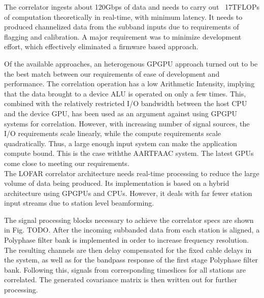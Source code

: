 \documentclass{ws-jai}
\begin{document}
The correlator ingests about 120Gbps of data and needs to carry out ~17TFLOPs of
computation  theoretically  in real-time,  with  minimum  latency. It  needs  to
produced  channelized  data from  the  subband  inputs  due to  requirements  of
flagging  and calibration.   A  major requirement  was  to minimize  development
effort, which effectively eliminated a firmware based approach.

Of the available approaches, an heterogenous GPGPU approach turned out to be the
best match between our requirements of  ease of development and performance. The
correlation operation  has a  low Arithmetic Intensity,  implying that  the data
brought to a device ALU is operated on only a few times. This, combined with the
relatively restricted I/O bandwidth between the host CPU and the device GPU, has
been used as  an argument against using GPGPU systems  for correlation. However,
with increasing number  of signal sources, the I/O  requirements scale linearly,
while the compute  requirements scale quadratically. Thus, a  large enough input
system can make the application compute bound. This is the case withthe AARTFAAC
system. The latest GPUs come close to meeting our requirements.\\
The LOFAR correlator architecture needs real-time processing to reduce the large
volume  of  data  being  produced.  Its implementation  is  based  on  a  hybrid
architecture using  GPGPUs and CPUs.  However,  it deals with far  fewer station
input streams due to station level beamforming.


The signal processing blocks necessary to achieve the correlator specs are shown
in Fig. TODO.  After the incoming subbanded data from each station is aligned, a
Polyphase filter bank is implemented  in order to increase frequency resolution.
The resulting channels are then delay  compensated for the fixed cable delays in
the system, as  well as for the  bandpass response of the  first stage Polyphase
filter  bank.  Following  this, signals  from corresponding  timeslices for  all
stations are correlated. The generated covariance matrix is then written out for
further processing.
\end{document}
